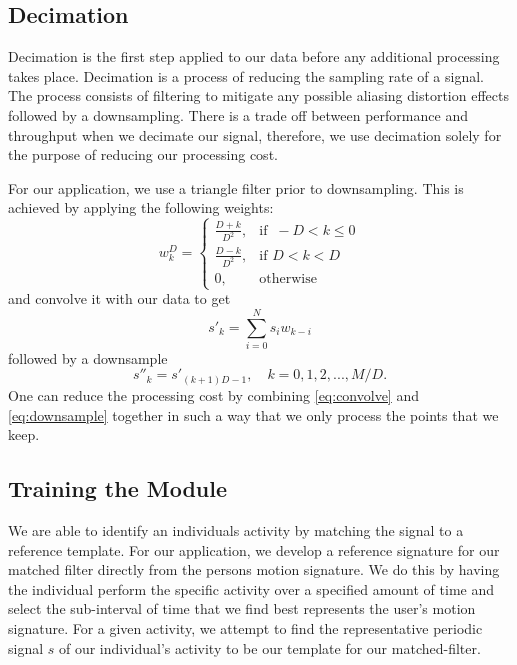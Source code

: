 \documentclass[journal]{IEEEtran}
\begin{document}
\subsection{Decimation}
Decimation is the first step applied to our data before any additional processing takes place.
Decimation is a process of reducing the sampling rate of a signal.
The process consists of filtering to mitigate any possible aliasing distortion effects followed by a downsampling.
There is a trade off between performance and throughput when we decimate our signal, therefore, we use decimation solely for the purpose of reducing our processing cost.

For our application, we use a triangle filter prior to downsampling. This is achieved by applying the following weights:
%
\begin{equation} \label{eq:triangle_filter_weights}
w_k^D =
\begin{cases}
  \frac{D+k}{D^2}, & \text{if }\ -D < k \leq 0 \\
  \frac{D-k}{D^2}, & \text{if } D < k < D \\
  0, & \text{otherwise}
\end{cases}
\end{equation}
%
and convolve it with our data to get
%
\begin{equation} \label{eq:convolve}
s'_k = \sum_{i=0}^{N} s_i w_{k-i}
\end{equation}
%
followed by a downsample
%
\begin{equation} \label{eq:downsample}
s''_k = s'_{(k+1)D-1}, \quad k = 0, 1, 2, ..., M/D.
\end{equation}
%
One can reduce the processing cost by combining \eqref{eq:convolve} and \eqref{eq:downsample} together in such a way that we only process the points that we keep.
%
\subsection{Training the Module}
We are able to identify an individual\textquotesingle s activity by matching the signal to a reference template.
For our application, we develop a reference signature for our matched filter directly from the person\textquotesingle s motion signature.
We do this by having the individual perform the specific activity over a specified amount of time and select the sub-interval of time that we find best represents the user's motion signature.
For a given activity, we attempt to find the representative periodic signal $s$ of our individual’s activity to be our template for our matched-filter.
\end{document}
